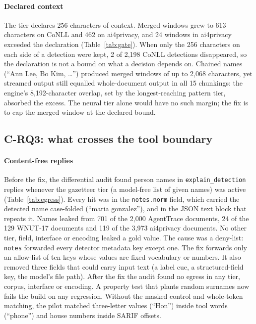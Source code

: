 \paragraph{Declared context} The tier declares 256 characters of context. Merged windows grew to 613 characters on CoNLL and 462 on ai4privacy, and 24 windows in ai4privacy exceeded the declaration (Table~\ref{tab:gate}). When only the 256 characters on each side of a detection were kept, 2 of 2,198 CoNLL detections disappeared, so the declaration is not a bound on what a decision depends on. Chained names (``Ann Lee, Bo Kim, \dots'') produced merged windows of up to 2,068 characters, yet streamed output still equalled whole-document output in all 15 chunkings: the engine's 8,192-character overlap, set by the longest-reaching pattern tier, absorbed the excess. The neural tier alone would have no such margin; the fix is to cap the merged window at the declared bound.

\subsection{C-RQ3: what crosses the tool boundary}\label{sec:egress}



\paragraph{Content-free replies} Before the fix, the differential audit found person names in \texttt{explain\_\allowbreak detection} replies whenever the gazetteer tier (a model-free list of given names) was active (Table~\ref{tab:egress}). Every hit was in the \texttt{notes.norm} field, which carried the detected name case-folded (``maria gonzalez''), and in the JSON text block that repeats it. Names leaked from 701 of the 2,000 AgentTrace documents, 24 of the 129 WNUT-17 documents and 119 of the 3,973 ai4privacy documents. No other tier, field, interface or encoding leaked a gold value. The cause was a deny-list: \texttt{notes} forwarded every detector metadata key except one. The fix forwards only an allow-list of ten keys whose values are fixed vocabulary or numbers. It also removed three fields that could carry input text (a label cue, a structured-field key, the model's file path). After the fix the audit found no egress in any tier, corpus, interface or encoding. A property test that plants random surnames now fails the build on any regression. Without the masked control and whole-token matching, the pilot matched three-letter values (``Hon'') inside tool words (``phone'') and house numbers inside SARIF offsets.


